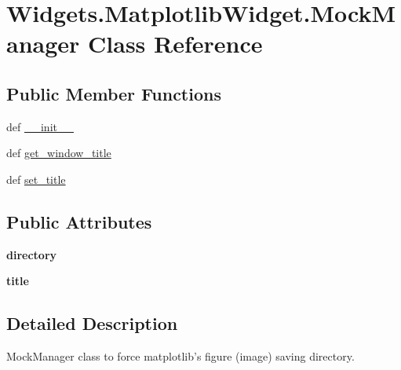 \hypertarget{classWidgets_1_1MatplotlibWidget_1_1MockManager}{\section{Widgets.\-Matplotlib\-Widget.\-Mock\-Manager Class Reference}
\label{classWidgets_1_1MatplotlibWidget_1_1MockManager}
}
\subsection*{Public Member Functions}
\begin{DoxyCompactItemize}
\item 
def \hyperlink{classWidgets_1_1MatplotlibWidget_1_1MockManager_ad46b5855f2bbf5a0b55878b5f2bc7afe}{\-\_\-\-\_\-init\-\_\-\-\_\-}
\item 
def \hyperlink{classWidgets_1_1MatplotlibWidget_1_1MockManager_a28003d4027ec9cd2573ecc80e894c328}{get\-\_\-window\-\_\-title}
\item 
def \hyperlink{classWidgets_1_1MatplotlibWidget_1_1MockManager_a0ce29448975ba851ed970fe421fd1c10}{set\-\_\-title}
\end{DoxyCompactItemize}
\subsection*{Public Attributes}
\begin{DoxyCompactItemize}
\item 
\hypertarget{classWidgets_1_1MatplotlibWidget_1_1MockManager_a327f2ea9b03b234c848f1cd8496130ed}{{\bfseries directory}}\label{classWidgets_1_1MatplotlibWidget_1_1MockManager_a327f2ea9b03b234c848f1cd8496130ed}

\item 
\hypertarget{classWidgets_1_1MatplotlibWidget_1_1MockManager_a59f027976be46ab2aebb634639c24865}{{\bfseries title}}\label{classWidgets_1_1MatplotlibWidget_1_1MockManager_a59f027976be46ab2aebb634639c24865}

\end{DoxyCompactItemize}


\subsection{Detailed Description}
\begin{DoxyVerb}MockManager class to force matplotlib's figure (image) saving directory.
\end{DoxyVerb}
 

